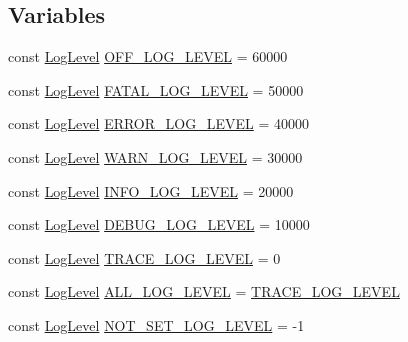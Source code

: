 \subsection*{Variables}
\begin{DoxyCompactItemize}
\item 
const \hyperlink{namespacelog4cplus_abd332cc8c98fefcbbdcf57b6b3867de9}{Log\-Level} \hyperlink{namespacelog4cplus_aaa2b4ed77016eca6e26cac1f148d20c6}{O\-F\-F\-\_\-\-L\-O\-G\-\_\-\-L\-E\-V\-E\-L} = 60000
\item 
const \hyperlink{namespacelog4cplus_abd332cc8c98fefcbbdcf57b6b3867de9}{Log\-Level} \hyperlink{namespacelog4cplus_a76a5d06eac76291ab55ec042d81c028a}{F\-A\-T\-A\-L\-\_\-\-L\-O\-G\-\_\-\-L\-E\-V\-E\-L} = 50000
\item 
const \hyperlink{namespacelog4cplus_abd332cc8c98fefcbbdcf57b6b3867de9}{Log\-Level} \hyperlink{namespacelog4cplus_a4828581892f170bb319d5719f88178f3}{E\-R\-R\-O\-R\-\_\-\-L\-O\-G\-\_\-\-L\-E\-V\-E\-L} = 40000
\item 
const \hyperlink{namespacelog4cplus_abd332cc8c98fefcbbdcf57b6b3867de9}{Log\-Level} \hyperlink{namespacelog4cplus_a042650a0a6fd89ef9b23c39185d438c9}{W\-A\-R\-N\-\_\-\-L\-O\-G\-\_\-\-L\-E\-V\-E\-L} = 30000
\item 
const \hyperlink{namespacelog4cplus_abd332cc8c98fefcbbdcf57b6b3867de9}{Log\-Level} \hyperlink{namespacelog4cplus_a4275eaa8f9ec01a87bfec24d6b87cdb6}{I\-N\-F\-O\-\_\-\-L\-O\-G\-\_\-\-L\-E\-V\-E\-L} = 20000
\item 
const \hyperlink{namespacelog4cplus_abd332cc8c98fefcbbdcf57b6b3867de9}{Log\-Level} \hyperlink{namespacelog4cplus_a9d74faee54b25eca5298aa2f0add28d7}{D\-E\-B\-U\-G\-\_\-\-L\-O\-G\-\_\-\-L\-E\-V\-E\-L} = 10000
\item 
const \hyperlink{namespacelog4cplus_abd332cc8c98fefcbbdcf57b6b3867de9}{Log\-Level} \hyperlink{namespacelog4cplus_a4ee6ad08f0e8c93a9ac1ad4678115ca6}{T\-R\-A\-C\-E\-\_\-\-L\-O\-G\-\_\-\-L\-E\-V\-E\-L} = 0
\item 
const \hyperlink{namespacelog4cplus_abd332cc8c98fefcbbdcf57b6b3867de9}{Log\-Level} \hyperlink{namespacelog4cplus_adffab3d436930cb99d3dc713f428b96c}{A\-L\-L\-\_\-\-L\-O\-G\-\_\-\-L\-E\-V\-E\-L} = \hyperlink{namespacelog4cplus_a4ee6ad08f0e8c93a9ac1ad4678115ca6}{T\-R\-A\-C\-E\-\_\-\-L\-O\-G\-\_\-\-L\-E\-V\-E\-L}
\item 
const \hyperlink{namespacelog4cplus_abd332cc8c98fefcbbdcf57b6b3867de9}{Log\-Level} \hyperlink{namespacelog4cplus_a63227df3dcb3420d748bbcb1f5b357c6}{N\-O\-T\-\_\-\-S\-E\-T\-\_\-\-L\-O\-G\-\_\-\-L\-E\-V\-E\-L} = -\/1

\end{DoxyCompactItemize}
